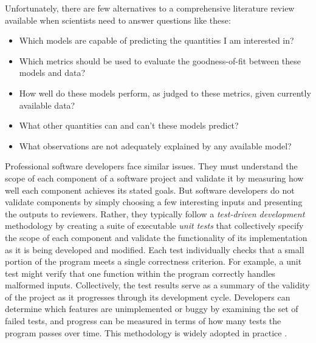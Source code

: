 \documentclass[11pt,letterpaper]{article}
\begin{document}

Unfortunately, there are few alternatives to a comprehensive literature review available when scientists need to answer questions like these:
\begin{itemize}
\item Which models are capable of predicting the quantities I am interested in?
\item Which metrics should be used to evaluate the goodness-of-fit between these models and  data?
\item How well do these models perform, as judged to these metrics, given currently available data?
\item What other quantities can and can't these models predict?
\item What observations are not adequately explained by any available model?
\end{itemize}




Professional software developers face similar issues. They must understand the scope of each component of a software project and validate it by measuring how well each component achieves its stated goals. But software developers do not validate components by simply choosing a few interesting inputs and presenting the outputs to reviewers. Rather, they typically follow a \emph{test-driven development} methodology by creating a suite of executable \emph{unit tests} that collectively specify the scope of each component and validate the functionality of its implementation as it is being developed and modified. Each test individually checks that a small portion of the program meets a single correctness criterion. For example, a unit test might verify that one function within the program correctly handles malformed inputs. Collectively, the test results serve as a summary of the validity of the project as it progresses through its development cycle. Developers can determine which features are unimplemented or buggy by examining the set of failed tests, and progress can be measured in terms of how many tests the program passes over time. This methodology is widely adopted in practice \cite{tdd}.
\end{document}

